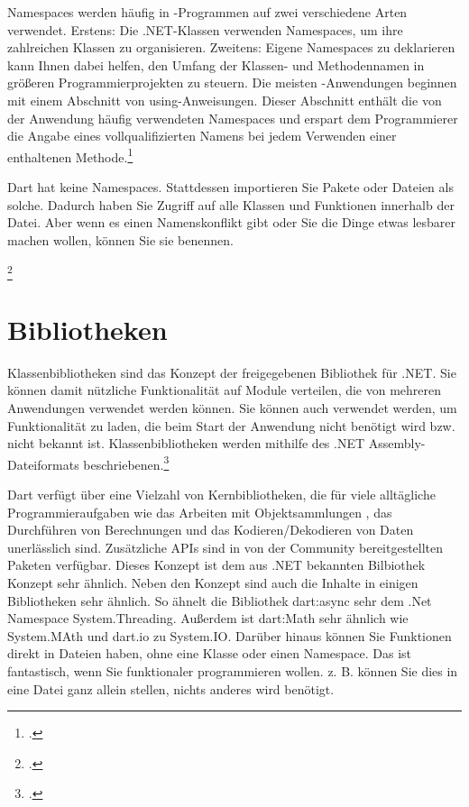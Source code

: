 Namespaces werden häufig in \Csharp -Programmen auf zwei verschiedene Arten verwendet. Erstens: Die .NET-Klassen verwenden Namespaces, um ihre zahlreichen Klassen zu organisieren. Zweitens: Eigene Namespaces zu deklarieren kann Ihnen dabei helfen, den Umfang der Klassen- und Methodennamen in größeren Programmierprojekten zu steuern.
Die meisten \Csharp -Anwendungen beginnen mit einem Abschnitt von using-Anweisungen. Dieser Abschnitt enthält die von der Anwendung häufig verwendeten Namespaces und erspart dem Programmierer die Angabe eines vollqualifizierten Namens bei jedem Verwenden einer enthaltenen Methode.\footcite[Vgl.  Verwenden von Namespaces (\Csharp-Programmierhandbuch)][Abgerufen am \today]{GoogleFlutterSharedPreferences2020} 



Dart hat keine Namespaces. Stattdessen importieren Sie Pakete oder Dateien als solche.
Dadurch haben Sie Zugriff auf alle Klassen und Funktionen innerhalb der Datei. Aber wenn es einen Namenskonflikt gibt oder Sie die Dinge etwas lesbarer machen wollen, können Sie sie benennen.

\begin{minipage}{\linewidth}

\end{minipage}
\footcitetext[In Anlehnung an ][Abgerufen am \today]{Pedley2019}

\section{Bibliotheken}

Klassenbibliotheken sind das Konzept der freigegebenen Bibliothek für .NET. Sie können damit nützliche Funktionalität auf Module verteilen, die von mehreren Anwendungen verwendet werden können. Sie können auch verwendet werden, um Funktionalität zu laden, die beim Start der Anwendung nicht benötigt wird bzw. nicht bekannt ist. Klassenbibliotheken werden mithilfe des .NET Assembly-Dateiformats beschriebenen.\footcite[Vgl. .NET-Klassenbibliotheken
][Abgerufen am \today]{GoogleFlutterSharedPreferences2020} 

Dart verfügt über eine Vielzahl von Kernbibliotheken, die für viele alltägliche Programmieraufgaben wie das Arbeiten mit Objektsammlungen , das Durchführen von Berechnungen und das Kodieren/Dekodieren von Daten  unerlässlich sind.  Zusätzliche APIs sind in von der Community bereitgestellten Paketen verfügbar. Dieses Konzept ist dem aus .NET bekannten Bilbiothek Konzept sehr ähnlich.
Neben den Konzept sind auch die Inhalte in einigen Bibliotheken sehr ähnlich. So ähnelt die Bibliothek dart:async sehr dem .Net Namespace System.Threading.  Außerdem ist dart:Math sehr ähnlich wie System.MAth und dart.io zu System.IO.
Darüber hinaus können Sie Funktionen direkt in Dateien haben, ohne eine Klasse oder einen Namespace. Das ist fantastisch, wenn Sie funktionaler programmieren wollen. z. B. können Sie dies in eine Datei ganz allein stellen, nichts anderes wird benötigt.

